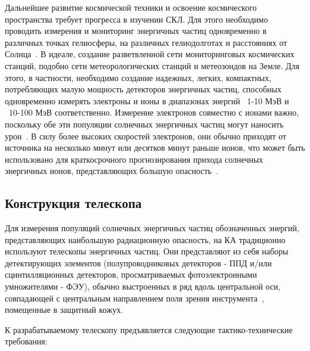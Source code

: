 Дальнейшее развитие космической техники и освоение космического пространства требует прогресса в изучении СКЛ. Для этого необходимо проводить измерения и мониторинг энергичных частиц одновременно в различных точках гелиосферы, на различных гелиодолготах и расстояниях от Солнца~\cite{schrijver2015understanding}. В идеале, создание разветвленной сети мониторинговых космических станций, подобно сети метеорологических станций и метеозондов на Земле. Для этого, в частности, необходимо создание надежных, легких, компактных, потребляющих малую мощность детекторов энергичных частиц, способных одновременно измерять электроны и ионы в диапазонах энергий ~1-10 МэВ и ~10-100 МэВ соответственно. Измерение электронов совместно с ионами важно, поскольку обе эти популяции солнечных энергичных частиц могут наносить урон~\cite{petrukovich2008}. В силу более высоких скоростей электронов, они обычно приходят от источника на несколько минут или десятков минут раньше ионов, что может быть использовано для краткосрочного прогнозирования прихода солнечных энергичных ионов, представляющих большую опасность~\cite{posner2007up}.


 

\subsection{Конструкция телескопа}

Для измерения популяций солнечных энергичных частиц обозначенных энергий,
представляющих наибольшую радиационную опасность, на КА традиционно используют
телескопы энергичных частиц. Они представляют из себя наборы детектирующих
элементов (полупроводниковых детекторов - ППД и/или сцинтилляционных детекторов, просматриваемых фотоэлектронными умножителями - ФЭУ), обычно выстроенных в ряд вдоль центральной оси, совпадающей с центральным направлением поля зрения инструмента~\cite{wuest2007calibration,galperin1972}, помещенные в  защитный кожух. 

К разрабатываемому телескопу предъявляется следующие тактико-технические требования:

